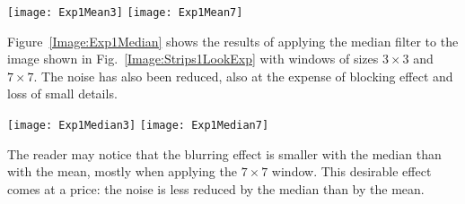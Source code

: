 \begin{figure*}[hbt]
	\texttt{[image: Exp1Mean3]}
	\texttt{[image: Exp1Mean7]}
	\caption{Speckled strips filtered with the mean and windows of sizes $3\times3$ (left) and $7\times7$ (right)}\label{Image:Exp1Mean}
\end{figure*}

Figure~\ref{Image:Exp1Median} shows the results of applying the median filter to the image shown in Fig.~\ref{Image:Strips1LookExp} with windows of sizes $3\times3$ and $7\times7$.
The noise has also been reduced, also at the expense of blocking effect and loss of small details.

\begin{figure*}[hbt]
	\texttt{[image: Exp1Median3]}
	\texttt{[image: Exp1Median7]}
	\caption{Speckled strips filtered with the median and windows of sizes $3\times3$ (left) and $7\times7$ (right)}\label{Image:Exp1Median}
\end{figure*}

The reader may notice that the blurring effect is smaller with the median than with the mean, mostly when applying the $7\times7$ window.
This desirable effect comes at a price: the noise is less reduced by the median than by the mean.